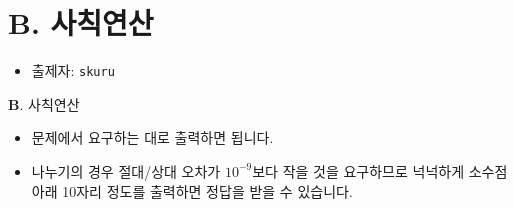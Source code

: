 \section{B. 사칙연산}

\begin{frame} %
    \begin{itemize}
        \item 출제자: \texttt{skuru}
    \end{itemize}
\end{frame}

\begin{frame}{\textbf{B}. 사칙연산}
    \begin{itemize}
        \item 문제에서 요구하는 대로 출력하면 됩니다.
        \item 나누기의 경우 절대/상대 오차가 $10^{-9}$보다 작을 것을 요구하므로 넉넉하게 소수점 아래 10자리 정도를 출력하면 정답을 받을 수 있습니다.
    \end{itemize}
\end{frame}
